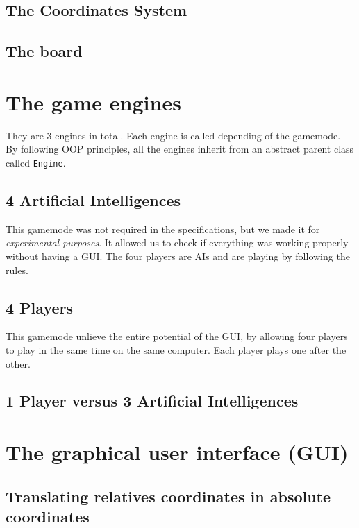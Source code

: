 \documentclass[english, 11pt, titlepage]{article}
\begin{document}
    \subsection{The Coordinates System}

    \subsection{The board}

    \section{The game engines}
    They are 3 engines in total. Each engine is called depending of the gamemode. By following OOP principles, all the engines inherit from an abstract parent class called \verb|Engine|.

    \subsection{4 Artificial Intelligences}
    This gamemode was not required in the specifications, but we made it for \emph{experimental purposes}. It allowed us to check if everything was working properly without having a GUI. The four players are AIs and are playing by following the rules.
    \subsection{4 Players}
    This gamemode unlieve the entire potential of the GUI, by allowing four players to play in the same time on the same computer. Each player plays one after the other.

    \subsection{1 Player versus 3 Artificial Intelligences}

    \section{The graphical user interface (GUI)}
    \subsection{Translating relatives coordinates in absolute coordinates}
    
\end{document}
